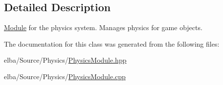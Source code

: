 \subsection{Detailed Description}
\mbox{\hyperlink{class_e_l_b_a_1_1_module}{Module}} for the physics system. Manages physics for game objects. 

The documentation for this class was generated from the following files\+:\begin{DoxyCompactItemize}
\item 
elba/\+Source/\+Physics/\mbox{\hyperlink{_physics_module_8hpp}{Physics\+Module.\+hpp}}\item 
elba/\+Source/\+Physics/\mbox{\hyperlink{_physics_module_8cpp}{Physics\+Module.\+cpp}}\end{DoxyCompactItemize}
